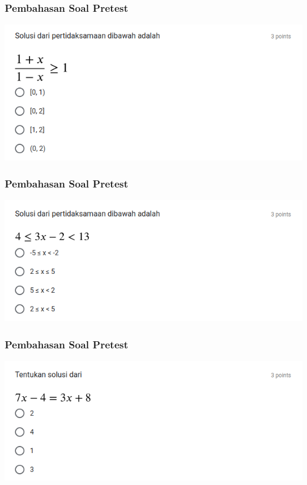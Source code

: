\documentclass[pdflatex,compress,mathserif]{beamer}
\begin{document}
	\begin{frame}
		\frametitle{Pembahasan Soal Pretest}
		\begin{center}
			\includegraphics[width=\linewidth]{img/img10}
		\end{center}
	\end{frame}
	
	\begin{frame}
		\frametitle{Pembahasan Soal Pretest}
		\begin{center}
			\includegraphics[width=\linewidth]{img/img11}
		\end{center}
	\end{frame}
	
	\begin{frame}
		\frametitle{Pembahasan Soal Pretest}
		\begin{center}
			\includegraphics[width=\linewidth]{img/img12}
		\end{center}
	\end{frame}
	
\end{document}
